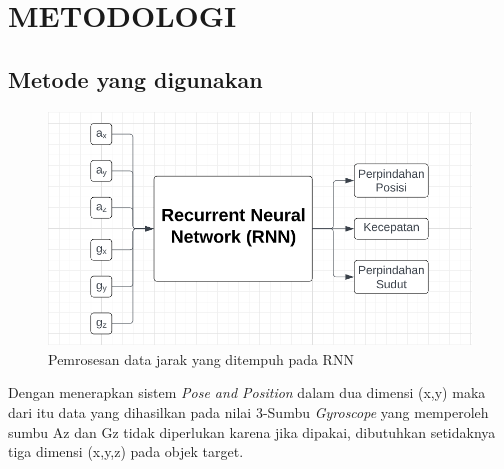 \chapter{METODOLOGI}


\section{Metode yang digunakan}

\begin{figure} [ht] \centering
  \includegraphics[scale=0.35]{gambar/RNN-3Dimensi.png}
  \caption{Pemrosesan data jarak yang ditempuh pada RNN}
  \label{fig:RNN-3D}
\end{figure}

Dengan menerapkan sistem \emph{Pose and Position} dalam dua dimensi (x,y) maka dari itu data yang dihasilkan pada nilai 3-Sumbu \emph{Gyroscope} 
yang memperoleh sumbu Az dan Gz tidak diperlukan karena jika dipakai, dibutuhkan setidaknya tiga dimensi (x,y,z) pada objek target.

